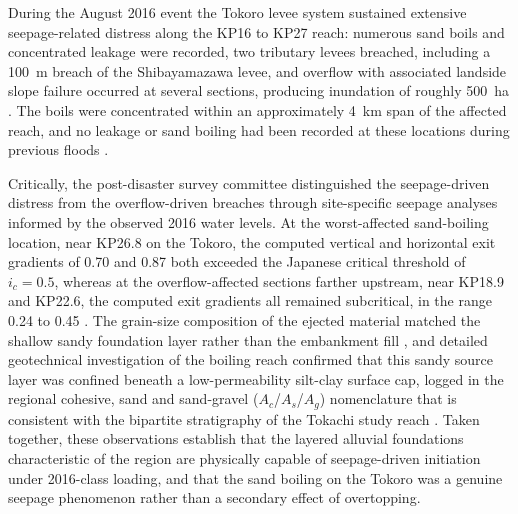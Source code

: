 During the August 2016 event the Tokoro levee system sustained extensive seepage-related distress along the KP16 to KP27 reach: numerous sand boils and concentrated leakage were recorded, two tributary levees breached, including a 100~m breach of the Shibayamazawa levee, and overflow with associated landside slope failure occurred at several sections, producing inundation of roughly 500~ha \parencite{tokorogawa_2017}. The boils were concentrated within an approximately 4~km span of the affected reach, and no leakage or sand boiling had been recorded at these locations during previous floods \parencite{morita_2018}.

Critically, the post-disaster survey committee distinguished the seepage-driven distress from the overflow-driven breaches through site-specific seepage analyses informed by the observed 2016 water levels. At the worst-affected sand-boiling location, near KP26.8 on the Tokoro, the computed vertical and horizontal exit gradients of 0.70 and 0.87 both exceeded the Japanese critical threshold of $i_c = 0.5$, whereas at the overflow-affected sections farther upstream, near KP18.9 and KP22.6, the computed exit gradients all remained subcritical, in the range 0.24 to 0.45 \parencite{tokorogawa_2017}. The grain-size composition of the ejected material matched the shallow sandy foundation layer rather than the embankment fill \parencite{kawajiri_2025}, and detailed geotechnical investigation of the boiling reach confirmed that this sandy source layer was confined beneath a low-permeability silt-clay surface cap, logged in the regional cohesive, sand and sand-gravel ($A_c$/$A_s$/$A_g$) nomenclature that is consistent with the bipartite stratigraphy of the Tokachi study reach \parencite{morita_2018}. Taken together, these observations establish that the layered alluvial foundations characteristic of the region are physically capable of seepage-driven initiation under 2016-class loading, and that the sand boiling on the Tokoro was a genuine seepage phenomenon rather than a secondary effect of overtopping.

